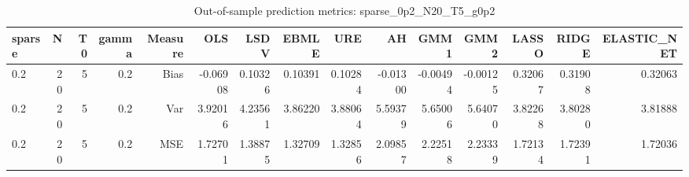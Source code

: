 \begin{table}[!htbp]\centering
\caption{Out-of-sample prediction metrics: sparse_0p2_N20_T5_g0p2}
\label{tab:table3_sparse_0p2_N20_T5_g0p2}
\begin{tabular}{lrrrrrrrrrrrrrr}
\hline
sparse & N & T0 & gamma & Measure & OLS & LSDV & EBMLE & URE & AH & GMM1 & GMM2 & LASSO & RIDGE & ELASTIC_NET \\
\hline
0.2 & 20 & 5 & 0.2 & Bias & -0.06908 & 0.10326 & 0.10391 & 0.10284 & -0.01300 & -0.00494 & -0.00125 & 0.32067 & 0.31908 & 0.32063 \\
0.2 & 20 & 5 & 0.2 & Var & 3.92016 & 4.23561 & 3.86220 & 3.88064 & 5.59379 & 5.65006 & 5.64070 & 3.82268 & 3.80280 & 3.81888 \\
0.2 & 20 & 5 & 0.2 & MSE & 1.72701 & 1.38875 & 1.32709 & 1.32856 & 2.09857 & 2.22518 & 2.23339 & 1.72134 & 1.72391 & 1.72036 \\
\hline
\end{tabular}
\end{table}

